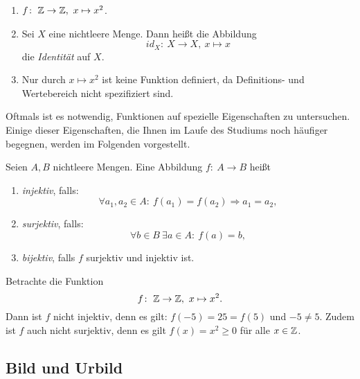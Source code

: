 \begin{frame}
\begin{example}
\begin{enumerate}
\item $f\!:\ \mathbb{Z} \to \mathbb{Z},\ x \mapsto x^2$.

\item Sei $X$ eine nichtleere Menge. Dann heißt die Abbildung
\[
  id_X\!:\ X \to X,\ x \mapsto x
\]
die \textit{Identität} auf $X$.

\item Nur durch $x \mapsto x^2$ ist keine Funktion definiert, da
Definitions- und Wertebereich nicht spezifiziert sind.
\end{enumerate}
\end{example}
\end{frame}


\begin{frame}
Oftmals ist es notwendig, Funktionen auf spezielle Eigenschaften zu untersuchen.
Einige dieser Eigenschaften, die Ihnen im Laufe des Studiums noch häufiger
begegnen, werden im Folgenden vorgestellt.

\begin{mydef}
Seien $A,B$ nichtleere Mengen.
Eine Abbildung $f\!:\ A \to B$ heißt

\begin{enumerate}
\item \textit{injektiv}, falls:
\[
  \forall a_1,a_2 \in A\!:\ f(a_1)=f(a_2) \Rightarrow a_1 = a_2,
\]

\item \textit{surjektiv}, falls:
\[
  \forall b \in B \ \exists a \in A\!:\ f(a) = b,
\]

\item \textit{bijektiv}, falls $f$ surjektiv und injektiv ist.
\end{enumerate}
\end{mydef}
\end{frame}


\begin{frame}
\begin{example}
Betrachte die Funktion
\[
    f\!:\ \mathbb{Z} \to \mathbb{Z}, \ x \mapsto x^2.
\]
Dann ist $f$ nicht injektiv, denn es gilt: $f(-5) = 25 = f(5)$ und $-5 \neq 5$.
Zudem ist $f$ auch nicht surjektiv, denn es gilt $f(x) = x^2 \geq 0$ für alle
$x \in \mathbb{Z}$.
\end{example}
\end{frame}


\subsection{Bild und Urbild}

